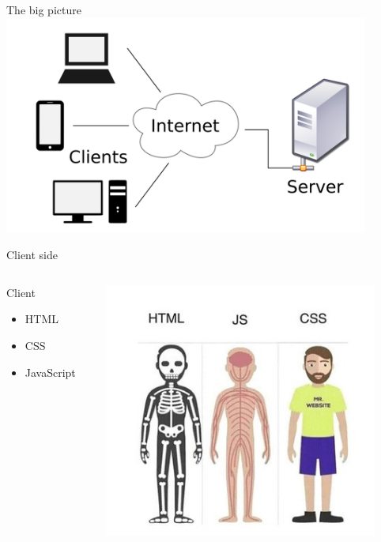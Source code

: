 \documentclass{beamer}
\begin{document}
\begin{frame}{The big picture}
	\centering
	\includegraphics[width=0.9\textwidth]{figs/client-server.png}
\end{frame}

\begin{frame}{Client side}
	\begin{columns}
		\begin{column}{0.5\textwidth}
			Client
			\begin{itemize}
				\item HTML
				\item CSS
				\item JavaScript
			\end{itemize}
		\end{column}
		\pause
		\begin{column}{0.5\textwidth}
			\includegraphics[width=0.9\textwidth]{figs/web-tech.jpeg}
		\end{column}
	\end{columns}
\end{frame}
\end{document}

